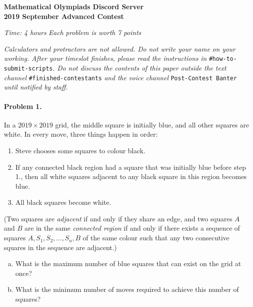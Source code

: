 \documentclass[11pt]{article}
\begin{document}
		\noindent \Large\textbf{Mathematical Olympiads Discord Server}
		\vspace{5pt}\\
		\noindent \huge\textbf{2019 September Advanced Contest}\\
		\noindent \makebox[\linewidth]{\rule{\textwidth}{0.4pt}}
			
	\normalsize
	
	\begin{flushright}
	\textit{Time: 4 hours} \hfill \textit{Each problem is worth 7 points}
	\end{flushright}
	
	\noindent \textit{Calculators and protractors are not allowed. Do not write your name on your working. After your timeslot finishes, please read the instructions in} \texttt{\#how-to-submit-scripts}\textit{. Do not discuss the contents of this paper outside the text channel }\texttt{\#finished-contestants}\textit{ and the voice channel }\texttt{Post-Contest Banter}\textit{ until notified by staff.}
	
	\paragraph{Problem 1.} In a $2019 \times 2019$ grid, the middle square is initially blue, and all other squares are white. In every move, three things happen in order:
	\begin{enumerate}
	\item Steve chooses some squares to colour black.
	\item If any connected black region had a square that was initially blue before step 1., then all white squares adjacent to any black square in this region becomes blue.
	\item All black squares become white.
	\end{enumerate}
	
	(Two squares are \emph{adjacent} if and only if they share an edge, and two squares \(A\) and \(B\) are in the same \emph{connected region} if and only if there exists a sequence of squares \(A, S_1, S_2, \dots, S_n, B\) of the same colour such that any two consecutive squares in the sequence are adjacent.)
	
	\begin{enumerate}[(a)]
	\item What is the maximum number of blue squares that can exist on the grid at once?
	\item What is the minimum number of moves required to achieve this number of squares?
	\end{enumerate}
	
\end{document}
